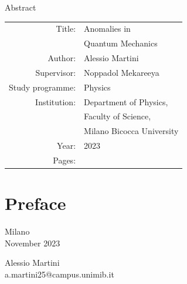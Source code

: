 \documentclass[a4paper,12pt,twoside]{report}
\def\headingStyle{\sffamily}
\begin{document}
\newpage
\pagestyle{empty} %
\mbox{}
\clearpage



\clearpage

\newpage
\mbox{}
\clearpage

\centerline{\headingStyle\Large Abstract}
\bigskip
\noindent

\vfil
{\centering
  \begin{tabular}{rl}
    Title:           & Anomalies in              \\
                     & Quantum Mechanics         \\
    Author:          & Alessio Martini           \\
    Supervisor:      & Noppadol Mekareeya        \\
    Study programme: & Physics                   \\
    Institution:     & Department of Physics,    \\
                     & Faculty of Science,       \\
                     & Milano Bicocca University \\
    Year:            & 2023                      \\
    Pages:           & \pageref{LastPage}
  \end{tabular}
}
\vfil
\noindent

\clearpage


\newpage
\mbox{}
\clearpage


\mbox{}
\noindent

\vfil
\clearpage


\pagestyle{fancy}


\chapter*{Preface}



\noindent
\parbox{.4\textwidth}{
  Milano
  \\
  November 2023
}
\hfill
\parbox{.4\textwidth}{\flushright{}
  Alessio Martini
  \\
  a.martini25@campus.unimib.it
}
\end{document}
